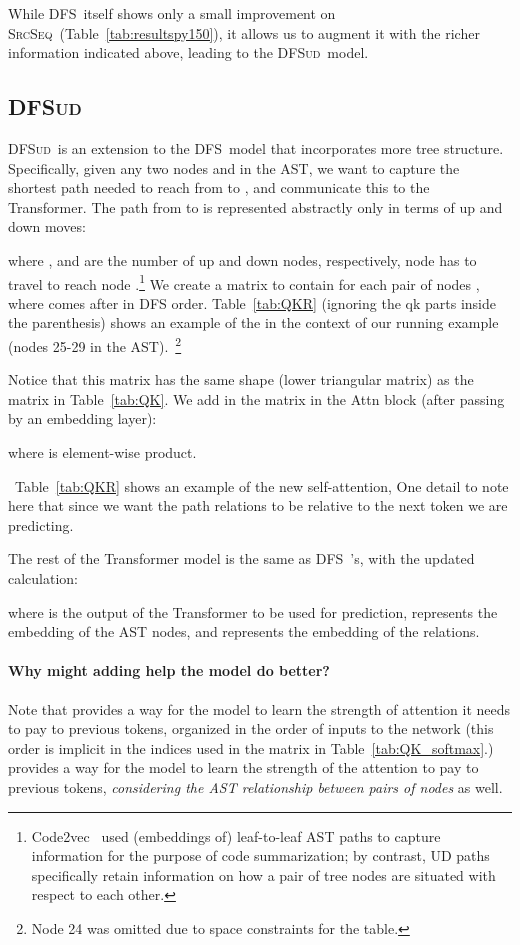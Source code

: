 \documentclass[nonacm, sigconf]{acmart}
\newcommand{\abbr}[1]{\textsc{#1}~}
\newcommand{\SrcSeq}{\abbr{SrcSeq}} \newcommand{\SrcRNN}{\abbr{SrcRNN}} \newcommand{\LeafSeq}{\abbr{LeafSeq}} \newcommand{\RootPath}{\abbr{RootPath}} \newcommand{\LeafTokens}{\abbr{LeafTokens}} \newcommand{\DFS}{\abbr{DFS}} \newcommand{\TreeRel}{\abbr{DFS{ud}}} \newcommand{\TreeReli}{\abbr{DFS{ud+}}}
\newcommand{\tabref}[1]{Table~\ref{#1}}
\begin{document}
While \DFS itself shows only a small improvement on \SrcSeq (Table~\ref{tab:resultspy150}), it allows us to augment it with the richer information indicated above, leading to the \TreeRel model.



\subsection{\TreeRel}
\label{sec:dfsud}

\TreeRel is an extension to the \DFS model that incorporates more tree structure.  Specifically, given any two nodes  and  in the AST, we want to capture the shortest path needed to reach from  to , and communicate this to the Transformer.  The
path from  to  is represented abstractly only in terms of up and down moves:

where , and  are the number of up and down nodes, respectively, node  has to travel to reach node .\footnote{Code2vec~\citep{alon2019code2vec} used (embeddings of) leaf-to-leaf AST paths to capture information for the purpose of code summarization; by contrast, UD paths specifically retain information on how a pair of tree nodes are situated with respect to each other.
}  
We create a matrix  to contain  for each pair of nodes , where  comes after  in DFS order. \tabref{tab:QKR} (ignoring the qk parts inside the parenthesis) shows an example of the  in the context of our running example (nodes 25-29 in the AST).~\footnote{Node 24 was omitted due to space constraints for the table.} 

Notice that this matrix has the same shape (lower triangular matrix) as the  matrix in \tabref{tab:QK}.  We add in the  matrix in the Attn block (after passing by an embedding layer): 

where  is element-wise product. 

~\tabref{tab:QKR} shows an example of the new self-attention,   One detail to note here that  since we want the path relations to be relative to the next token we are predicting.

The rest of the Transformer model is the same as \DFS's, with the updated  calculation:

where  is the output of the Transformer to be used for prediction,  represents the embedding of the AST nodes, and  represents the embedding of the  relations.

\paragraph{Why might adding  help the model do better?}
Note that  provides a way for the model to learn the strength of attention it needs to pay to previous tokens, organized in the order of inputs to the network (this order is implicit in the indices used in the matrix in \tabref{tab:QK_softmax}.)    provides a way for the model to learn the strength of the attention to pay to previous tokens, \textit{considering the AST relationship between pairs of nodes} as well.
\end{document}
